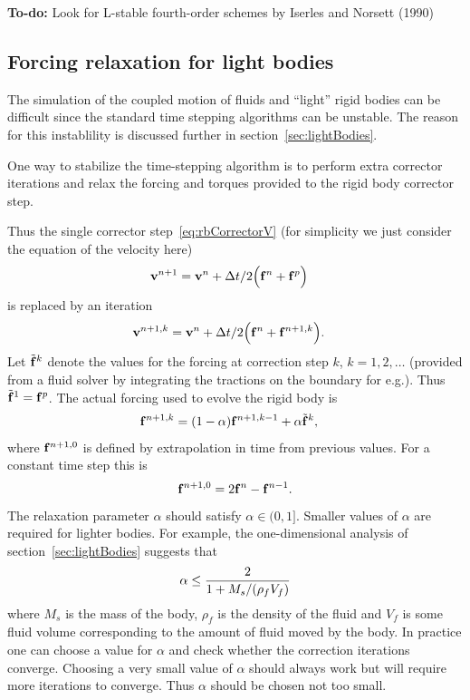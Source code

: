 {\bf To-do:} Look for L-stable fourth-order schemes by Iserles and Norsett (1990)




\subsection{Forcing relaxation for light bodies}\label{sec:lightBodyForcingRelaxation}

The simulation of the coupled motion of fluids and ``light'' rigid bodies can be
difficult since the standard time stepping algorithms can be unstable. The reason for this
instablility is discussed further in section~\ref{sec:lightBodies}.

One way to stabilize the time-stepping algorithm is to perform extra corrector iterations and
relax the forcing and torques provided to the rigid body corrector step. 

Thus the single corrector step~\eqref{eq:rbCorrectorV} (for simplicity we just consider the equation 
of the velocity here)
\begin{align}
    \mathbf{ v}^{n+1} &= \mathbf{ v}^{n} + {\Delta t}/2\Big( \mathbf{ f}^{n} + \mathbf{ f}^p \Big)  
\end{align}
is replaced by an iteration 
\begin{align}
    \mathbf{ v}^{n+1,k} &= \mathbf{ v}^{n} + {\Delta t}/2\Big( \mathbf{ f}^{n} + \mathbf{ f}^{n+1,k} \Big)  . 
\end{align}
Let $\tilde{\mathbf{ f}}^{k}$ denote the values for the forcing at correction step $k$, $k=1,2,\ldots$ (provided from a fluid solver
by integrating the tractions on the boundary for e.g.). Thus $\tilde{\mathbf{ f}}^{1}=\mathbf{ f}^p$. 
The actual forcing used to evolve the rigid body is 
\begin{align}
    \mathbf{ f}^{n+1,k} &= (1-\alpha)\mathbf{ f}^{n+1,k-1} + \alpha \tilde{\mathbf{ f}}^{k}, 
\end{align}
where $\mathbf{ f}^{n+1,0}$ is defined by extrapolation in time from previous values. For a constant time step this is 
\[
 \mathbf{ f}^{n+1,0}=2\mathbf{ f}^{n}-\mathbf{ f}^{n-1}.
\]
The relaxation parameter $\alpha$ should satisfy $\alpha\in (0,1]$.  Smaller values of $\alpha$ are required for 
lighter bodies. For example, the one-dimensional analysis of section~\ref{sec:lightBodies} suggests that
\begin{align}
    \alpha \le {2 \over 1 + M_s/(\rho_f V_f) } 
\end{align}
where $M_s$ is the mass of the body, $\rho_f$ is the density of the fluid and $V_f$ is some fluid volume corresponding to
the amount of fluid moved by the body. In practice one can choose a value for $\alpha$ and check whether the 
correction iterations converge. Choosing a very small value of $\alpha$ should always work but will require
more iterations to converge. Thus $\alpha$ should be chosen not too small. 

